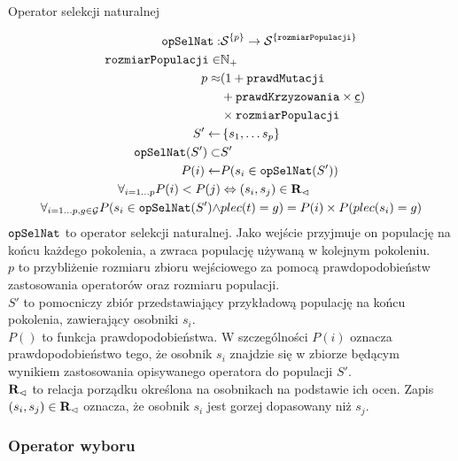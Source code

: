 \documentclass[./FM_mgr.tex]{subfiles}
\begin{document}
\begin{signature}
	\caption{Operator selekcji naturalnej \label{signature:natSel}}
	\begin{align}
	\mathtt{opSelNat}: &{\mathcal{S}}^{ \{ p \}} \rightarrow {\mathcal{S}}^{ \{ \mathtt{rozmiarPopulacji} \}} \\
	\mathtt{rozmiarPopulacji} \in &\mathbb{N}_{+} \\
	p \approx &(1 + \mathtt{prawdMutacji} \\
	&+ \mathtt{prawdKrzyzowania} \times \mathsf{\underline{c}}) \\
	&\times \mathtt{rozmiarPopulacji} \\
	S' \gets &\left\{ s_1, \ldots s_p \right\} \\
	\mathtt{opSelNat}(S') \subset & S' \\
	P(i) \gets &P(s_i \in \mathtt{opSelNat}(S')) \\
	\forall_{i = 1 \ldots p}P(i) < P(j) &\Leftrightarrow (s_i, s_j) \in {\mathbf{R}}_{\lhd} \\
	\label{line:gender_resistant}
	\forall_{i = 1 \ldots p, g \in \mathcal{G}} P(s_i \in \mathtt{opSelNat}(S') \wedge & plec(t) = g) = P(i) \times P(plec(s_i) = g)
	\end{align}
	$\mathtt{opSelNat}$ to operator selekcji naturalnej.
	Jako wejście przyjmuje on populację na końcu każdego pokolenia, a zwraca populację używaną w kolejnym pokoleniu. \\
	$p$ to przybliżenie rozmiaru zbioru wejściowego za pomocą prawdopodobieństw zastosowania operatorów oraz rozmiaru populacji.\\
	$S'$ to pomocniczy zbiór przedstawiający przykładową populację na końcu pokolenia, zawierający osobniki $s_i$. \\
	$P()$ to funkcja prawdopodobieństwa. 
	W szczególności $P(i)$ oznacza prawdopodobieństwo tego, że osobnik $s_i$ znajdzie się w zbiorze będącym wynikiem zastosowania opisywanego operatora do populacji $S'$.\\
	${\mathbf{R}}_{\lhd}$ to relacja porządku określona na osobnikach na podstawie ich ocen. Zapis $(s_i, s_j) \in {\mathbf{R}}_{\lhd}$ oznacza, że osobnik $s_i$ jest gorzej dopasowany niż $s_j$.
\end{signature}

\subsubsection{Operator wyboru}
\end{document}
